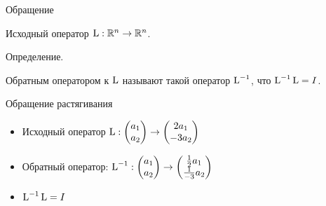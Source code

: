 

\begin{frame} %


\end{frame}
  

\begin{frame}{Обращение}


Исходный оператор $\operatorname{L} : \mathbb{R}^n \to \mathbb{R}^n$.


Определение. 

\alert{Обратным оператором} к $\operatorname{L}$ называют такой оператор $\operatorname{L}^{-1}$, 
что $\operatorname{L}^{-1} \operatorname{L} = I$. 


\end{frame}


\begin{frame}{Обращение растягивания}

\begin{itemize}[<+->]
    \item 
Исходный оператор $\operatorname{L} : \begin{pmatrix}
  a_1 \\
  a_2 \\
\end{pmatrix} \to
\begin{pmatrix}
  2a_1 \\
  -3a_2 \\
\end{pmatrix}
$

\item \alert{Обратный оператор}:  
$\operatorname{L}^{-1} : \begin{pmatrix}
    a_1 \\
    a_2 \\
  \end{pmatrix} \to
  \begin{pmatrix}
    \frac{1}{2}a_1 \\
    \frac{1}{-3}a_2 \\
  \end{pmatrix}
  $

\item $\operatorname{L}^{-1} \operatorname{L} = I$
\end{itemize}


\end{frame}
    

